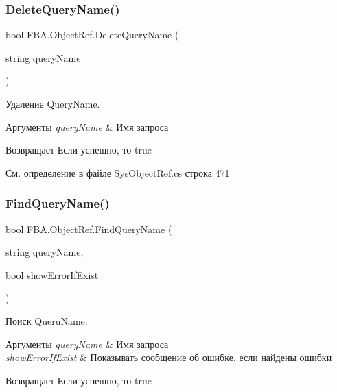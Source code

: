 \subsubsection{\texorpdfstring{Delete\+Query\+Name()}{DeleteQueryName()}}
{\footnotesize\ttfamily bool F\+B\+A.\+Object\+Ref.\+Delete\+Query\+Name (\begin{DoxyParamCaption}\item[{string}]{query\+Name }\end{DoxyParamCaption})}



Удаление Query\+Name. 


\begin{DoxyParams}{Аргументы}
{\em query\+Name} & Имя запроса\\
\hline
\end{DoxyParams}
\begin{DoxyReturn}{Возвращает}
Если успешно, то true
\end{DoxyReturn}


См. определение в файле Sys\+Object\+Ref.\+cs строка 471

\mbox{\label{class_f_b_a_1_1_object_ref_aa585836d091b26d68245f2ed81b2b3b0}} 
\subsubsection{\texorpdfstring{Find\+Query\+Name()}{FindQueryName()}}
{\footnotesize\ttfamily bool F\+B\+A.\+Object\+Ref.\+Find\+Query\+Name (\begin{DoxyParamCaption}\item[{string}]{query\+Name,  }\item[{bool}]{show\+Error\+If\+Exist }\end{DoxyParamCaption})}



Поиск Queru\+Name. 


\begin{DoxyParams}{Аргументы}
{\em query\+Name} & Имя запроса\\
\hline
{\em show\+Error\+If\+Exist} & Показывать сообщение об ошибке, если найдены ошибки\\
\hline
\end{DoxyParams}
\begin{DoxyReturn}{Возвращает}
Если успешно, то true
\end{DoxyReturn}


